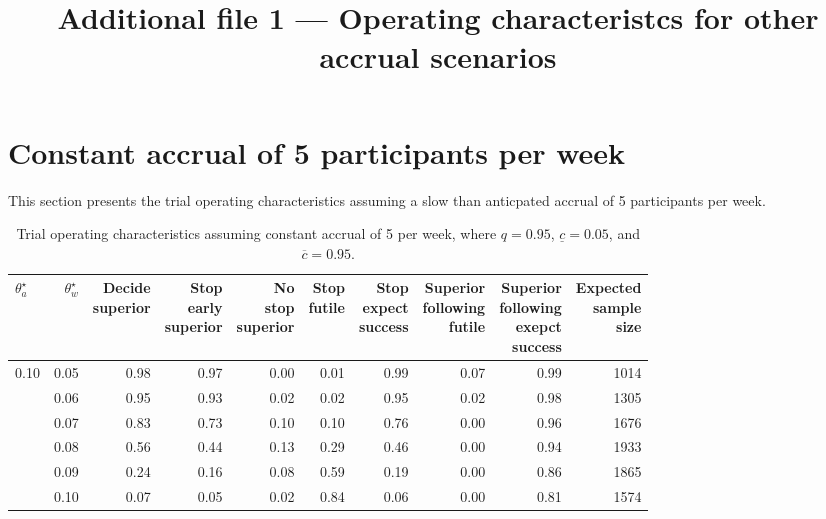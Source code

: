 \documentclass{article}
\title{Additional file 1 --- Operating characteristcs for other accrual scenarios}
\date{}
\begin{document}
\maketitle

\section{Constant accrual of 5 participants per week}

This section presents the trial operating characteristics assuming a slow than anticpated accrual of 5 participants per week.

\begin{table}[!ht]
	\footnotesize
	\caption{\label{tab:oc1}Trial operating characteristics assuming constant accrual of 5 per week, where $q=0.95$, $\underline{c}=0.05$, and $\overline{c}=0.95$.}
	\centering
	\begin{tabular}[t]{lrrrrrrrrr}
	\toprule
	$\theta_a^\star$ & $\theta_w^\star$ & \makecell{Decide\\superior} & \makecell{Stop\\early\\superior} & \makecell{No\\stop\\superior} & \makecell{Stop\\futile} & \makecell{Stop\\expect\\success} & \makecell{Superior\\following\\futile} & \makecell{Superior\\following\\exepct\\success} & \makecell{Expected\\sample\\size}\\
	\midrule
	0.10 & 0.05 & 0.98 & 0.97 & 0.00 & 0.01 & 0.99 & 0.07 & 0.99 & 1014\\
	     & 0.06 & 0.95 & 0.93 & 0.02 & 0.02 & 0.95 & 0.02 & 0.98 & 1305\\
	     & 0.07 & 0.83 & 0.73 & 0.10 & 0.10 & 0.76 & 0.00 & 0.96 & 1676\\
	     & 0.08 & 0.56 & 0.44 & 0.13 & 0.29 & 0.46 & 0.00 & 0.94 & 1933\\
	     & 0.09 & 0.24 & 0.16 & 0.08 & 0.59 & 0.19 & 0.00 & 0.86 & 1865\\
	     & 0.10 & 0.07 & 0.05 & 0.02 & 0.84 & 0.06 & 0.00 & 0.81 & 1574\\
	\bottomrule
	\end{tabular}
\end{table}
\end{document}
